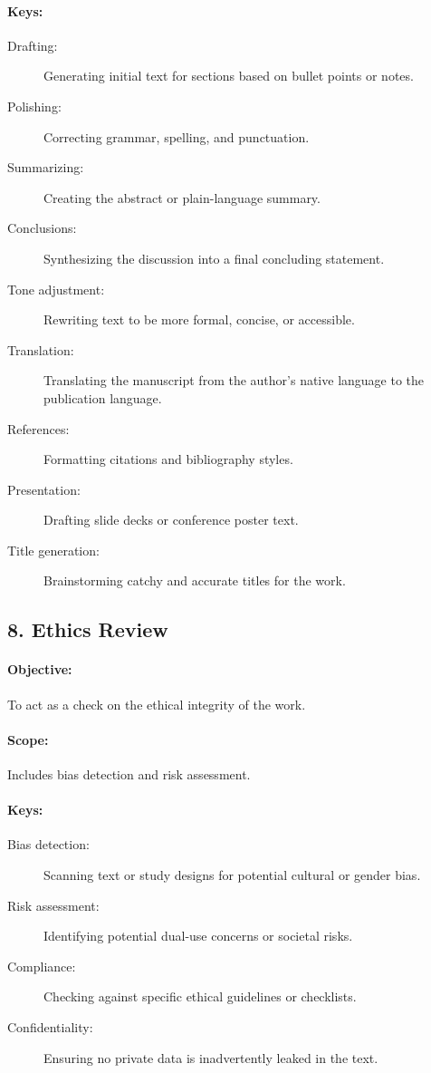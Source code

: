 \paragraph{Keys:}
\begin{description}
    \item[Drafting:] Generating initial text for sections based on bullet points or notes.
    \item[Polishing:] Correcting grammar, spelling, and punctuation.
    \item[Summarizing:] Creating the abstract or plain-language summary.
    \item[Conclusions:] Synthesizing the discussion into a final concluding statement.
    \item[Tone adjustment:] Rewriting text to be more formal, concise, or accessible.
    \item[Translation:] Translating the manuscript from the author's native language to the publication language.
    \item[References:] Formatting citations and bibliography styles.
    \item[Presentation:] Drafting slide decks or conference poster text.
    \item[Title generation:] Brainstorming catchy and accurate titles for the work.
\end{description}

\subsection*{8. Ethics Review}
\paragraph{Objective:} To act as a check on the ethical integrity of the work.
\paragraph{Scope:} Includes bias detection and risk assessment.
\paragraph{Keys:}
\begin{description}
    \item[Bias detection:] Scanning text or study designs for potential cultural or gender bias.
    \item[Risk assessment:] Identifying potential dual-use concerns or societal risks.
    \item[Compliance:] Checking against specific ethical guidelines or checklists.
    \item[Confidentiality:] Ensuring no private data is inadvertently leaked in the text.
\end{description}

